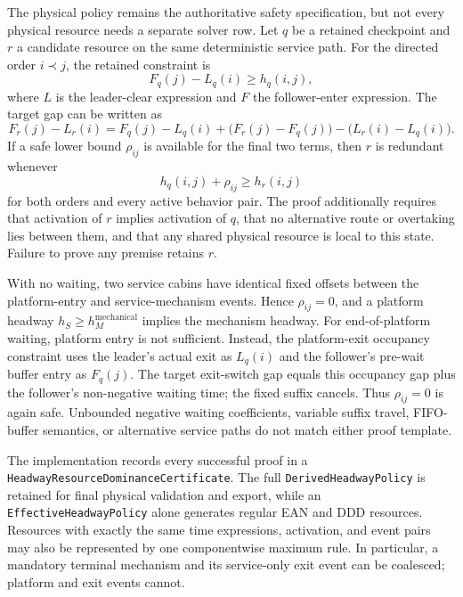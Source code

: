 \documentclass[11pt,a4paper]{scrartcl}
\begin{document}
The physical policy remains the authoritative safety specification, but not
every physical resource needs a separate solver row.  Let $q$ be a retained
checkpoint and $r$ a candidate resource on the same deterministic service
path.  For the directed order $i\prec j$, the retained constraint is
\begin{equation}
 F_q(j)-L_q(i)\ge h_q(i,j),
\label{eq:dominance-retained}
\end{equation}
where $L$ is the leader-clear expression and $F$ the follower-enter
expression.  The target gap can be written as
\begin{equation}
 F_r(j)-L_r(i)
 =F_q(j)-L_q(i)
  +\bigl(F_r(j)-F_q(j)\bigr)
  -\bigl(L_r(i)-L_q(i)\bigr).
\label{eq:dominance-transfer}
\end{equation}
If a safe lower bound $\rho_{ij}$ is available for the final two terms, then
$r$ is redundant whenever
\begin{equation}
 h_q(i,j)+\rho_{ij}\ge h_r(i,j)
\label{eq:dominance-test}
\end{equation}
for both orders and every active behavior pair.  The proof additionally
requires that activation of $r$ implies activation of $q$, that no alternative
route or overtaking lies between them, and that any shared physical resource
is local to this state.  Failure to prove any premise retains $r$.

With no waiting, two service cabins have identical fixed offsets between the
platform-entry and service-mechanism events.  Hence $\rho_{ij}=0$, and a
platform headway $h_S\ge h_M^{\mathrm{mechanical}}$ implies the mechanism
headway.  For end-of-platform waiting, platform entry is not sufficient.
Instead, the platform-exit occupancy constraint uses the leader's actual exit
as $L_q(i)$ and the follower's pre-wait buffer entry as $F_q(j)$.  The target
exit-switch gap equals this occupancy gap plus the follower's non-negative
waiting time; the fixed suffix cancels.  Thus $\rho_{ij}=0$ is again safe.
Unbounded negative waiting coefficients, variable suffix travel, FIFO-buffer
semantics, or alternative service paths do not match either proof template.

The implementation records every successful proof in a
\texttt{HeadwayResource\-Dominance\-Certificate}.  The full
\texttt{DerivedHeadwayPolicy} is retained for final physical validation and
export, while an \texttt{Effective\-Headway\-Policy} alone generates regular EAN
and DDD resources.  Resources with exactly the same time expressions,
activation, and event pairs may also be represented by one componentwise
maximum rule.  In particular, a mandatory terminal mechanism and its
service-only exit event can be coalesced; platform and exit events cannot.
\end{document}
